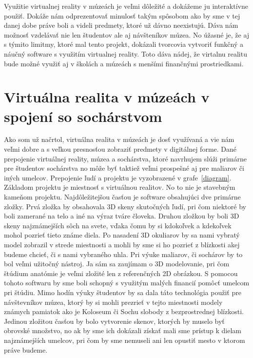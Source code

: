 \documentclass[10pt,oneside,slovak,a4paper]{article}
\begin{document}
Využitie virtualnej reality v múzeách je veľmi dôležité a dokážeme ju interaktívne použiť. Dokáže nám odprezentovať minulosť takým spôsobom ako by sme v tej danej dobe práve boli a videli predmety, ktoré už dávno neexistujú.  Dáva nám možnosť vzdelávať nie len študentov ale aj návšteníkov múzea. No úžasné je, že aj s týmito limitmy, ktoré mal tento projekt, dokázali tvorcovia vytvoriť funkčný a náučný software s využitím virtualnej reality. Toto dáva nádej, že virtalnu realitu bude možné využiť aj v školách a múzeách s menšími finančnými prostriedkami.



\section{Virtuálna realita v múzeách v spojení so sochárstvom} \label{produkt}

Ako som už načrtol, virtuálna realita v múzeách je dosť využívaná a vie nám veľmi dobre a s veľkou presnosťou zobraziť predmety v digitálnej forme. Dané prepojenie virtuálnej reality, múzea a sochárstva, ktoré navrhujem slúži primárne pre študentov sochárstva no môže byť taktiež veľmi prospešné aj pre maliarov či iných umelcov. Prepojenie ľudí a projektu je vyzobrazené v grafe~\ref{diagram}. Základom projektu je miestnosť s virtuálnou realitov. No to nie je stavebným kameňom projektu. Najdôležitejšou časťou je software obsahujúci dve primárne zložky. Prvá zložka by obsahovala 3D skeny skutočných ľudí, pri čom niektoré by boli zamerané na telo a iné na výraz tváre človeka. Druhou zložkou by boli 3D skeny najznámejších sôch na svete, vďaka čomu by si kdokoľvek a kdekoľvek mohol pozrieť tieto známe diela. Po nasadení 3D okuliarov by sa nami vybratý model zobrazil v strede miestnosti a mohli by sme si ho pozrieť z blízkosti akej budeme chcieť, či s nami vybraného uhla. Pri výuke maliarov, či sochárov by to bol veľmi užitočný nástroj. Ja sám sa zaujímam o 3D modelovanie, pri čom štúdium anatómie je veľmi zložité len z referenčných 2D obrázkou. S pomocou tohoto softwaru by sme boli schopný s využitým malých financií pomôcť umelcom pri štúdiu. Mimo hodín výuky študentov by sa dala táto technológia použiť pre návštevníkov múzea, ktorý by si mohli prezrieť v tejto miestnosti modely známych pamiatok ako je Koloseum či Sochu slobody z bezprostrednej blízkosti. Jedinou zložitou časťou by bolo vytvorenie skenov, ktorých by muselo byť obrovské množstvo, no ak by sme ich dokázali získať mali sme prístup k dielam najznámejších umelcov, pri čom by sme nemuseli ani len opustiť mesto v ktorom práve budeme. 
 
\end{document}
